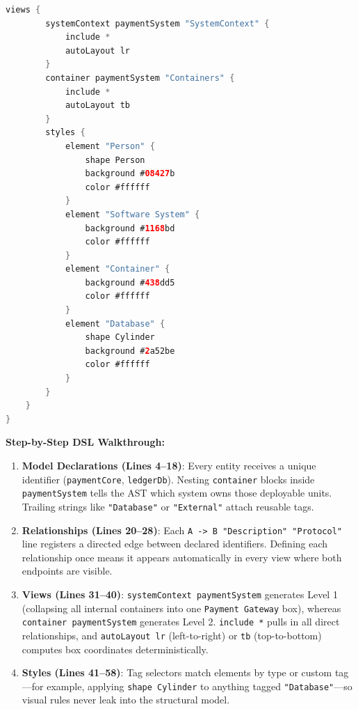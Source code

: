 \begin{lstlisting}[language=Java, caption={Structurizr DSL Workspace for Global Payments Gateway}]
    views {
        systemContext paymentSystem "SystemContext" {
            include *
            autoLayout lr
        }
        container paymentSystem "Containers" {
            include *
            autoLayout tb
        }
        styles {
            element "Person" {
                shape Person
                background #08427b
                color #ffffff
            }
            element "Software System" {
                background #1168bd
                color #ffffff
            }
            element "Container" {
                background #438dd5
                color #ffffff
            }
            element "Database" {
                shape Cylinder
                background #2a52be
                color #ffffff
            }
        }
    }
}
\end{lstlisting}

\textbf{Step-by-Step DSL Walkthrough:}
\begin{enumerate}[leftmargin=18pt]
  \item \textbf{Model Declarations (Lines 4--18)}: Every entity receives a unique identifier (\texttt{paymentCore}, \texttt{ledgerDb}). Nesting \texttt{container} blocks inside \texttt{paymentSystem} tells the AST which system owns those deployable units. Trailing strings like \texttt{"Database"} or \texttt{"External"} attach reusable tags.
  \item \textbf{Relationships (Lines 20--28)}: Each \texttt{A -> B "Description" "Protocol"} line registers a directed edge between declared identifiers. Defining each relationship once means it appears automatically in every view where both endpoints are visible.
  \item \textbf{Views (Lines 31--40)}: \texttt{systemContext paymentSystem} generates Level 1 (collapsing all internal containers into one \texttt{Payment Gateway} box), whereas \texttt{container paymentSystem} generates Level 2. \texttt{include *} pulls in all direct relationships, and \texttt{autoLayout lr} (left-to-right) or \texttt{tb} (top-to-bottom) computes box coordinates deterministically.
  \item \textbf{Styles (Lines 41--58)}: Tag selectors match elements by type or custom tag---for example, applying \texttt{shape Cylinder} to anything tagged \texttt{"Database"}---so visual rules never leak into the structural model.
\end{enumerate}

